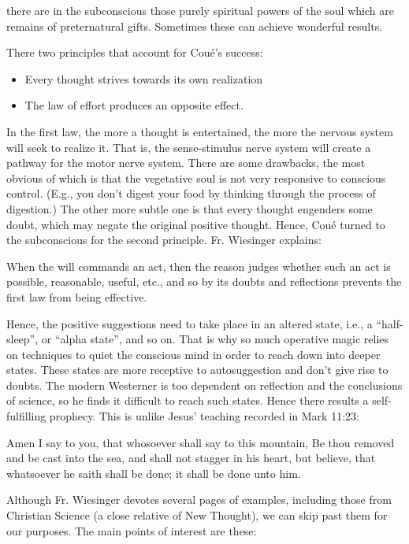\begin{quotex}
there are in the subconscious those purely spiritual powers of the soul which are remains of preternatural gifts. Sometimes these can achieve wonderful results. 

\end{quotex}
There two principles that account for Coué's success:

\begin{itemize}
\item Every thought strives towards its own realization 
\item The law of effort produces an opposite effect. 
\end{itemize}
In the first law, the more a thought is entertained, the more the nervous system will seek to realize it. That is, the sense-stimulus nerve system will create a pathway for the motor nerve system. There are some drawbacks, the most obvious of which is that the vegetative soul is not very responsive to conscious control. (E.g., you don't digest your food by thinking through the process of digestion.) The other more subtle one is that every thought engenders some doubt, which may negate the original positive thought. Hence, Coué turned to the subconscious for the second principle. Fr. Wiesinger explains:

\begin{quotex}
When the will commands an act, then the reason judges whether such an act is possible, reasonable, useful, etc., and so by its doubts and reflections prevents the first law from being effective. 

\end{quotex}
Hence, the positive suggestions need to take place in an altered state, i.e., a “half-sleep”, or “alpha state”, and so on. That is why so much operative magic relies on techniques to quiet the conscious mind in order to reach down into deeper states. These states are more receptive to autosuggestion and don't give rise to doubts. The modern Westerner is too dependent on reflection and the conclusions of science, so he finds it difficult to reach such states. Hence there results a self-fulfilling prophecy. This is unlike Jesus' teaching recorded in Mark 11:23:

\begin{quotex}
Amen I say to you, that whosoever shall say to this mountain, Be thou removed and be cast into the sea, and shall not stagger in his heart, but believe, that whatsoever he saith shall be done; it shall be done unto him. 

\end{quotex}
Although Fr. Wiesinger devotes several pages of examples, including those from Christian Science (a close relative of New Thought), we can skip past them for our purposes. The main points of interest are these:

